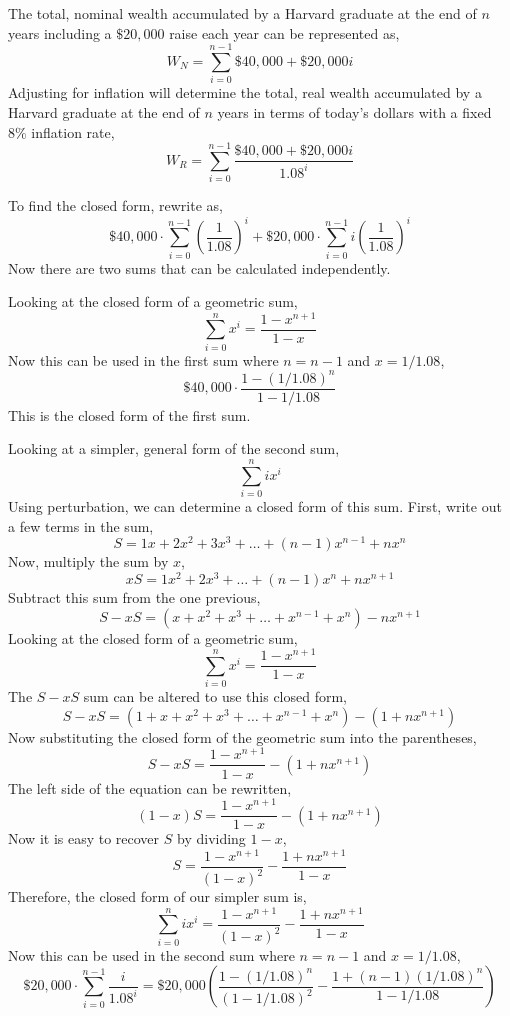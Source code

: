 \documentclass{article}
\begin{document}
The total, nominal wealth accumulated by a Harvard graduate at the end of $n$
years including a $\$20,000$ raise each year can be represented as,
$$ W_N = \sum\limits_{i = 0}^{n - 1} \$40,000 + \$20,000 i $$
Adjusting for inflation will determine the total, real wealth accumulated by a
Harvard graduate at the end of $n$ years in terms of today's dollars with a
fixed $8\%$ inflation rate,
$$ W_R = \sum\limits_{i = 0}^{n - 1} \frac{\$40,000 + \$20,000 i}{1.08^i} $$

To find the closed form, rewrite as,
$$ \$40,000 \cdot \sum\limits_{i = 0}^{n - 1} \left( \frac{1}{1.08} \right)^i +
\$20,000 \cdot \sum\limits_{i = 0}^{n - 1} i \left(\frac{1}{1.08}\right)^i $$
Now there are two sums that can be calculated independently.

Looking at the closed form of a geometric sum,
$$ \sum\limits_{i = 0}^n x^i = \frac{1 - x^{n + 1}}{1 - x} $$
Now this can be used in the first sum where $n = n - 1$ and $x = 1/1.08$,
$$ \$40,000 \cdot \frac{1 - (1/1.08)^n}{1 - 1/1.08} $$
This is the closed form of the first sum.

Looking at a simpler, general form of the second sum,
$$ \sum\limits_{i = 0}^n i x^i $$
Using perturbation, we can determine a closed form of this sum. First, write out
a few terms in the sum,
$$ S = 1x + 2x^2 + 3x^3 + \ldots + (n - 1)x^{n-1} + nx^n $$
Now, multiply the sum by $x$,
$$ xS = 1x^2 + 2x^3 + \ldots + (n - 1)x^n + nx^{n + 1} $$
Subtract this sum from the one previous,
$$ S - xS = \left( x + x^2 + x^3 + \ldots + x^{n - 1} + x^n \right) - nx^{n+1} $$
Looking at the closed form of a geometric sum,
$$ \sum\limits_{i = 0}^n x^i = \frac{1 - x^{n + 1}}{1 - x} $$
The $S - xS$ sum can be altered to use this closed form,
$$ S - xS = \left( 1 + x + x^2 + x^3 + \ldots + x^{n - 1} + x^n \right) -
\left(1 + nx^{n+1} \right) $$
Now substituting the closed form of the geometric sum into the parentheses,
$$ S - xS = \frac{1 - x^{n + 1}}{1 - x} - \left( 1 + nx^{n + 1} \right) $$
The left side of the equation can be rewritten,
$$ (1 - x) S = \frac{1 - x^{n + 1}}{1 - x} - \left( 1 + nx^{n + 1} \right) $$
Now it is easy to recover $S$ by dividing $1 - x$,
$$ S = \frac{1 - x^{n + 1}}{(1 - x)^2} - \frac{1 + nx^{n + 1}}{1 - x} $$
Therefore, the closed form of our simpler sum is,
$$ \sum\limits_{i = 0}^n i x^i = \frac{1 - x^{n + 1}}{(1 - x)^2} - \frac{1 +
nx^{n + 1}}{1 - x} $$
Now this can be used in the second sum where $n = n - 1$ and $x = 1/1.08$,
$$ \$20,000 \cdot \sum\limits_{i = 0}^{n - 1} \frac{i}{1.08^i} = \$20,000 \left( 
\frac{1 - (1/1.08)^n}{(1 - 1/1.08)^2} - \frac{1 + (n - 1) (1/1.08)^n}{1 -
1/1.08}\right) $$
\end{document}
